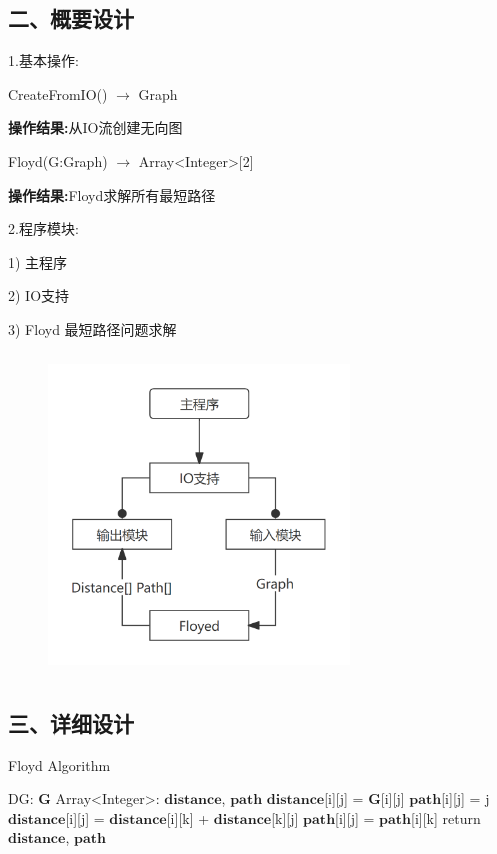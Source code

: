 \documentclass[UTF8, a4paper]{ctexart}
\begin{document}
\subsection*{二、概要设计}
\par
1.\;基本操作: \par
	CreateFromIO() $\rightarrow$ Graph \par
	\qquad\textbf{操作结果:}\;从IO流创建无向图 \par
	Floyd(G:Graph) $\rightarrow$ Array<Integer>[2] \par
	\qquad\textbf{操作结果:}\;Floyd求解所有最短路径 \par
2.\;程序模块: \par
1) 主程序 \par
2) IO支持 \par
3) Floyd 最短路径问题求解 \par
\begin{figure}[H]
	\begin{minipage}[t]{\linewidth}
		\centering
		\includegraphics[width=80mm,height=85mm]{./assets/DS11-1}
	\end{minipage}
\end{figure}

\subsection*{三、详细设计}
\begin{algorithm}[H]
\begin{algorithmic}[1]
\caption{Floyd Algorithm}
\Require DG: $\mathbf{G}$
\Ensure Array<Integer>: $\mathbf{distance}$, $\mathbf{path}$
	\State $\mathbf{distance}$[i][j] = $\mathbf{G}$[i][j]
	\State $\mathbf{path}$[i][j] = j
\EndFor
{}
			\State $\mathbf{distance}$[i][j] = $\mathbf{distance}$[i][k] + $\mathbf{distance}$[k][j]
			\State $\mathbf{path}$[i][j] = $\mathbf{path}$[i][k]
		\EndIf
	\EndFor
\EndFor
\State return $\mathbf{distance}$, $\mathbf{path}$
\end{algorithmic}
\end{algorithm}
\end{document}
